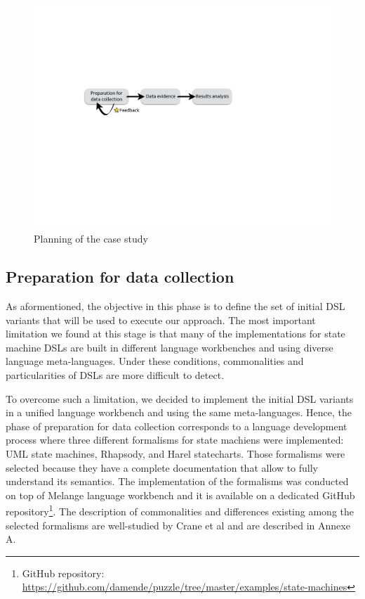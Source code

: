 \begin{figure}[h!]
	\centering
	\includegraphics[width=1\linewidth]{images/planning-casestudy-fig.pdf}
	\caption{Planning of the case study}
	\label{fig:planning}
\end{figure}

\subsection{Preparation for data collection}

As aformentioned, the objective in this phase is to define the set of initial DSL variants that will be used to execute our approach. The most important limitation we found at this stage is that many of the implementations for state machine DSLs are built in different language workbenches and using diverse language meta-languages. Under these conditions, commonalities and particularities of DSLs are more difficult to detect.

To overcome such a limitation, we decided to implement the initial DSL variants in a unified language workbench and using the same meta-languages. Hence, the phase of preparation for data collection corresponds to a language development process where three different formalisms for state machiens were implemented: UML state machines, Rhapsody, and Harel statecharts. Those formalisms were selected because they have a complete documentation that allow to fully understand its semantics. The implementation of the formalisms was conducted on top of Melange \cite{Degueule:2015a} language workbench and it is available on a dedicated GitHub repository\footnote{GitHub repository: \url{https://github.com/damende/puzzle/tree/master/examples/state-machines}}. The description of commonalities and differences existing among the selected formalisms are well-studied by Crane et al and are described in Annexe A. 

